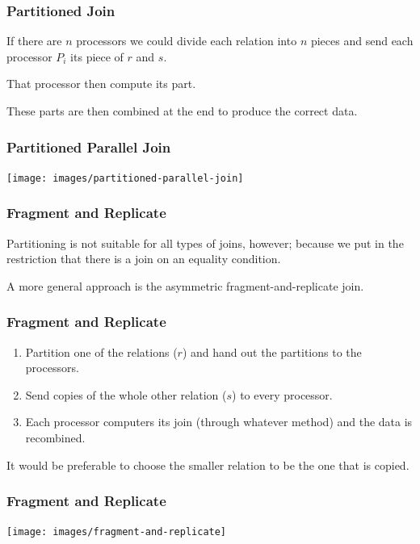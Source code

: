 \begin{frame}
\frametitle{Partitioned Join}
If there are $n$ processors we could divide each relation into $n$ pieces and send each processor $P_{i}$ its piece of $r$ and $s$. 

That processor then compute its part. 

These parts are then combined at the end to produce the correct data. 


\end{frame}

\begin{frame}
\frametitle{Partitioned Parallel Join}

\begin{center}
\texttt{[image: images/partitioned-parallel-join]}
\end{center}

\end{frame}

\begin{frame}
\frametitle{Fragment and Replicate}

Partitioning is not suitable for all types of joins, however; because we put in the restriction that there is a join on an equality condition. 

A more general approach is the \alert{asymmetric fragment-and-replicate join}.

\end{frame}

\begin{frame}
\frametitle{Fragment and Replicate}

\begin{enumerate}
\item Partition one of the relations ($r$) and hand out the partitions to the processors.
\item Send copies of the whole other relation ($s$) to every processor.
\item Each processor computers its join (through whatever method) and the data is recombined. 
\end{enumerate}

It would be preferable to choose the smaller relation to be the one that is copied.

\end{frame}

\begin{frame}
\frametitle{Fragment and Replicate}

\begin{center}
\texttt{[image: images/fragment-and-replicate]}
\end{center}

\end{frame}



